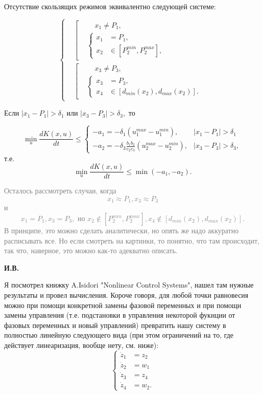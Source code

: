 \documentclass[11pt]{article}
\begin{document}
Отсутствие скользящих режимов эквивалентно следующей системе:

$$
	\left\{
	\begin{aligned}
		&\left[
		\begin{aligned}
			& \;\;\;\; x_1 \ne P_1, \\
			&\left\{
			\begin{aligned}
				x_1 &= P_1, \\
				x_2 & \in [P_2^{min}, P_2^{max}], 
			\end{aligned}
			\right.
		\end{aligned}
		\right. \\
		&\left[
		\begin{aligned}
			& \;\;\;\; x_3 \ne P_3, \\
			&\left\{
			\begin{aligned}
				x_3 &= P_3, \\
				x_4 & \in [d_{min}(x_2), d_{max}(x_2)].
			\end{aligned}
			\right.
		\end{aligned}
		\right.
	\end{aligned}
	\right.
$$

Если $|x_1 - P_1| > \delta_1$ или $|x_3 - P_3| > \delta_3,$ то 

$$
	\min\limits_u\frac{dK(x,u)}{dt} \leqslant \begin{cases} -a_1 = -\delta_1(u_1^{max} - u_1^{min}), &  |x_1 - P_1| > \delta_1 \\ -a_2 = -\delta_3\frac{b_1b_2}{c_2c_3}(u_2^{max} - u_2^{min}), & |x_3 - P_3| > \delta_3, \end{cases}
$$
т.е.
$$\min\limits_u\frac{dK(x,u)}{dt} \leqslant \min(-a_1, -a_2).$$

\textcolor{gray}{Осталось рассмотреть случаи, когда $$x_1 \approx P_1, x_3 \approx P_3$$ и $$x_1 = P_1, x_3 = P_3, \text{ но } x_2 \notin [P_2^{min}, P_2^{max}], x_4 \notin [d_{min}(x_2), d_{max}(x_2)].$$
В принципе, это можно сделать аналитически, но опять же надо аккуратно расписывать все. Но если смотреть на картинки, то понятно, что там происходит, так что, наверное, это можно как-то адекватно описать.}


{\bf И.В.}

Я посмотрел книжку A.Isidori "Nonlinear Control Systems", нашел там нужные результаты и провел вычисления.
Короче говоря, для любой точки равновесия можно при помощи конкретной замены фазовой переменных и
при помощи замены управления (т.е. подстановки в управления некоторой фукнции от фазовых переменных и новый управлений)
превратить нашу систему в полностью линейную следующего вида (при этом ограничений на то, где действует линеаризация,
вообще нету, см. ниже):
$$
    \left\{
    \begin{aligned}
    	\dot z_1 &= z_2 \\
	\dot z_2 &= w_1 \\
	\dot z_3 &= z_4 \\
	\dot z_4 &= w_2.    
    \end{aligned}
    \right.
$$
\end{document}
